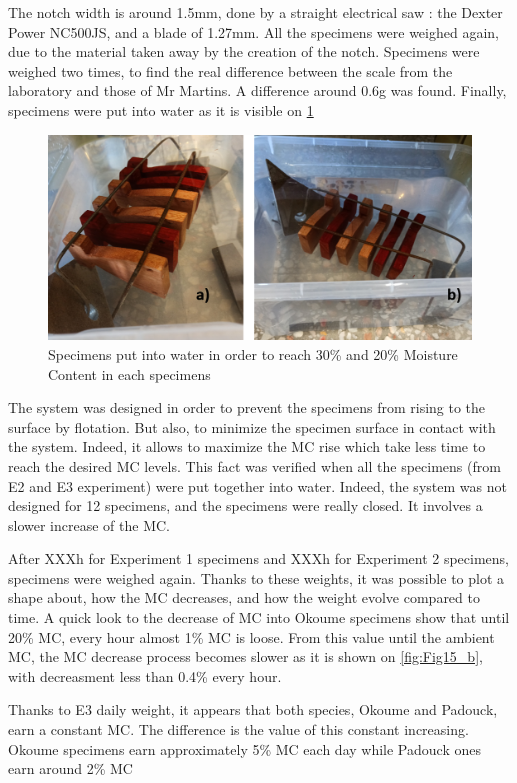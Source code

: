 The notch width is around 1.5mm, done by a straight electrical saw : the Dexter Power NC500JS, and a blade of 1.27mm. All the specimens were weighed again, due to the material taken away by the creation of the notch.
Specimens were weighed two times, to find the real difference between the scale from the laboratory and those of Mr Martins. A difference around 0.6g was found. Finally, specimens were put into water as it is visible on \ref{fig:Fig13}
\begin{figure}[h]
\includegraphics[width=\textwidth]{Figures/WaterSpecimens}
\decoRule
\caption[Specimen into water]{Specimens put into water in order to reach 30\% and 20\% Moisture Content in each specimens}
\label{fig:Fig13}
\end{figure}
The system was designed in order to prevent the specimens from rising to the surface by flotation. But also, to minimize the specimen surface in contact with the system. Indeed, it allows to maximize the MC rise which take less time to reach the desired MC levels. This fact was verified when all the specimens (from E2 and E3 experiment) were put together into water. Indeed, the system was not designed for 12 specimens, and the specimens were really closed. It involves a slower increase of the MC.

After XXXh for Experiment 1 specimens and XXXh for Experiment 2 specimens, specimens were weighed again. Thanks to these weights, it was possible to plot a shape about, how the MC decreases, and how the weight evolve compared to time. A quick look to the decrease of MC into Okoume specimens show that until 20\% MC, every hour almost 1\% MC is loose. From this value until the ambient MC, the MC decrease process becomes slower as it is shown on \ref{fig:Fig15_b}, with decreasment less than 0.4\% every hour.

Thanks to E3 daily weight, it appears that both species, Okoume and Padouck, earn a constant MC. The difference is the value of this constant increasing. Okoume specimens earn approximately 5\% MC each day while Padouck ones earn around 2\% MC



